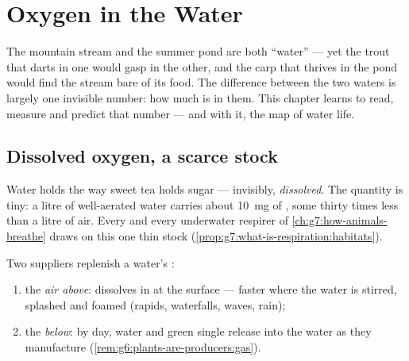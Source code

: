 \chapter{Oxygen in the Water}\label{ch:g7:oxygen-in-the-water}

The mountain stream and the summer pond are both ``water''
--- yet the trout that darts in one would gasp in the other,
and the carp that thrives in the pond would find the stream
bare of its food. The difference between the two waters is
largely one invisible number: how much  is  in
them. This chapter learns to read, measure and predict that
number --- and with it, the map of water life.

\section{Dissolved oxygen, a scarce stock}

\begin{definition}\label{def:g7:oxygen-in-the-water:dissolved}
Water holds  the way sweet tea holds sugar ---
invisibly, \emph{dissolved}. The
quantity is tiny: a litre of well-aerated water carries
about \qty{10}{mg} of , some thirty times less than a
litre of air. Every  and every underwater respirer of
\cref{ch:g7:how-animals-breathe} draws on this one thin
stock (\cref{prop:g7:what-is-respiration:habitats}).
\end{definition}

\begin{proposition}\label{prop:g7:oxygen-in-the-water:fills}
Two suppliers replenish a water's :
\begin{enumerate}
  \item the \emph{air above}:  dissolves in at the
        surface --- faster where the water is stirred,
        splashed and foamed (rapids, waterfalls, waves,
        rain);
  \item the \emph{ below}: by day, water 
        and green single  release  into the
        water as they manufacture
        (\cref{rem:g6:plants-are-producers:gas}).
\end{enumerate}
\end{proposition}
\admitted

